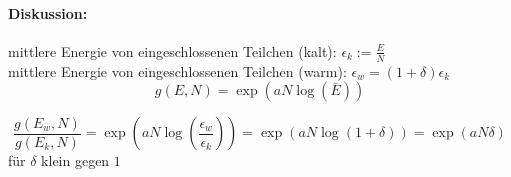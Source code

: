 \paragraph*{Diskussion:}
mittlere Energie von eingeschlossenen Teilchen (kalt):
$\epsilon _k := \frac EN$\\
mittlere Energie von eingeschlossenen Teilchen (warm):
$\epsilon _w = (1+\delta)\epsilon _k$
$$g(E, N) = \exp(aN\log(\bar E))$$

\begin{equation*}
    \frac{g(E_w, N)}{g(E_k, N)}=
    \exp(aN\log(\frac{\epsilon _w}{\epsilon _k}))=
    \exp(aN\log(1+\delta))=\exp(aN\delta)
\end{equation*}
für $\delta$ klein gegen $1$

